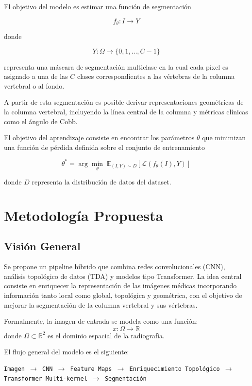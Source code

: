 \documentclass[conference]{IEEEtran}
\begin{document}
El objetivo del modelo es estimar una función de segmentación

\[
f_\theta : I \rightarrow Y
\]

donde

\[
Y : \Omega \rightarrow \{0,1,\dots,C-1\}
\]

representa una máscara de segmentación multiclase en la cual cada píxel es
asignado a una de las $C$ clases correspondientes a las vértebras de la columna
vertebral o al fondo.

A partir de esta segmentación es posible derivar representaciones geométricas
de la columna vertebral, incluyendo la línea central de la columna y métricas
clínicas como el ángulo de Cobb.

El objetivo del aprendizaje consiste en encontrar los parámetros $\theta$
que minimizan una función de pérdida definida sobre el conjunto de entrenamiento

\[
\theta^* = \arg\min_{\theta} \; \mathbb{E}_{(I,Y) \sim D}
\left[ \mathcal{L}(f_\theta(I),Y) \right]
\]

donde $D$ representa la distribución de datos del dataset.

\section{Metodología Propuesta}

\subsection{Visión General}

Se propone un pipeline híbrido que combina redes convolucionales (CNN), análisis topológico de datos (TDA) y modelos tipo Transformer. La idea central consiste en enriquecer la representación de las imágenes médicas incorporando información tanto local como global, topológica y geométrica, con el objetivo de mejorar la segmentación de la columna vertebral y sus vértebras.

Formalmente, la imagen de entrada se modela como una función:
\[
x : \Omega \rightarrow \mathbb{R}
\]
donde $\Omega \subset \mathbb{R}^2$ es el dominio espacial de la radiografía.

El flujo general del modelo es el siguiente:

\begin{center}
\texttt{Imagen $\rightarrow$ CNN $\rightarrow$ Feature Maps $\rightarrow$ Enriquecimiento Topológico $\rightarrow$ Transformer Multi-kernel $\rightarrow$ Segmentación}
\end{center}
\end{document}
